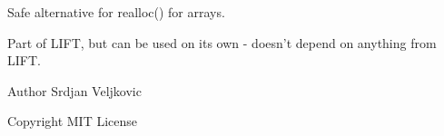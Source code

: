 Safe alternative for realloc() for arrays.

Part of L\-I\-F\-T, but can be used on its own -\/ doesn't depend on anything from L\-I\-F\-T. \begin{DoxyAuthor}{Author}
Srdjan Veljkovic 
\end{DoxyAuthor}
\begin{DoxyCopyright}{Copyright}
M\-I\-T License 
\end{DoxyCopyright}
